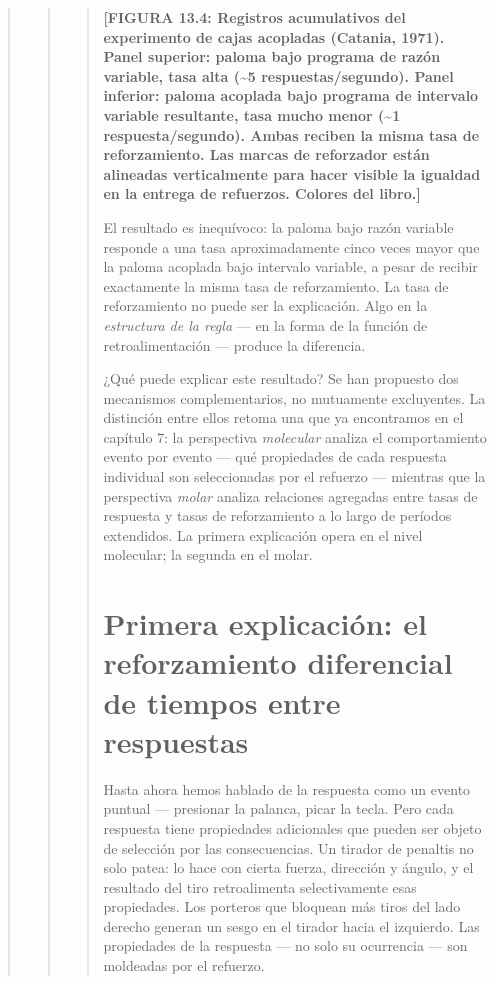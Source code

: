 \documentclass[
  letterpaper,
  DIV=11,
  numbers=noendperiod]{scrreprt}
\begin{document}
\begin{tcolorbox}[enhanced jigsaw, toprule=.15mm, arc=.35mm, colback=white, opacityback=0, colframe=quarto-callout-note-color-frame, breakable, rightrule=.15mm, left=2mm, leftrule=.75mm, bottomrule=.15mm]
\begin{quote}
\begin{quote}
\begin{quote}
\textbf{{[}FIGURA 13.4: Registros acumulativos del experimento de cajas
acopladas (Catania, 1971). Panel superior: paloma bajo programa de razón
variable, tasa alta (\textasciitilde5 respuestas/segundo). Panel
inferior: paloma acoplada bajo programa de intervalo variable
resultante, tasa mucho menor (\textasciitilde1 respuesta/segundo). Ambas
reciben la misma tasa de reforzamiento. Las marcas de reforzador están
alineadas verticalmente para hacer visible la igualdad en la entrega de
refuerzos. Colores del libro.{]}}

El resultado es inequívoco: la paloma bajo razón variable responde a una
tasa aproximadamente cinco veces mayor que la paloma acoplada bajo
intervalo variable, a pesar de recibir exactamente la misma tasa de
reforzamiento. La tasa de reforzamiento no puede ser la explicación.
Algo en la \emph{estructura de la regla} --- en la forma de la función
de retroalimentación --- produce la diferencia.

¿Qué puede explicar este resultado? Se han propuesto dos mecanismos
complementarios, no mutuamente excluyentes. La distinción entre ellos
retoma una que ya encontramos en el capítulo 7: la perspectiva
\emph{molecular} analiza el comportamiento evento por evento --- qué
propiedades de cada respuesta individual son seleccionadas por el
refuerzo --- mientras que la perspectiva \emph{molar} analiza relaciones
agregadas entre tasas de respuesta y tasas de reforzamiento a lo largo
de períodos extendidos. La primera explicación opera en el nivel
molecular; la segunda en el molar.

\section{Primera explicación: el reforzamiento diferencial de tiempos
entre
respuestas}\label{primera-explicaciuxf3n-el-reforzamiento-diferencial-de-tiempos-entre-respuestas}

Hasta ahora hemos hablado de la respuesta como un evento puntual ---
presionar la palanca, picar la tecla. Pero cada respuesta tiene
propiedades adicionales que pueden ser objeto de selección por las
consecuencias. Un tirador de penaltis no solo patea: lo hace con cierta
fuerza, dirección y ángulo, y el resultado del tiro retroalimenta
selectivamente esas propiedades. Los porteros que bloquean más tiros del
lado derecho generan un sesgo en el tirador hacia el izquierdo. Las
propiedades de la respuesta --- no solo su ocurrencia --- son moldeadas
por el refuerzo.


\end{quote}
\end{quote}
\end{quote}
\end{tcolorbox}
\end{document}
